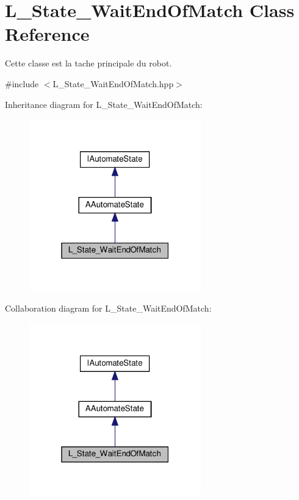 \hypertarget{classL__State__WaitEndOfMatch}{}\section{L\+\_\+\+State\+\_\+\+Wait\+End\+Of\+Match Class Reference}
\label{classL__State__WaitEndOfMatch}


Cette classe est la tache principale du robot.  




{\ttfamily \#include $<$L\+\_\+\+State\+\_\+\+Wait\+End\+Of\+Match.\+hpp$>$}



Inheritance diagram for L\+\_\+\+State\+\_\+\+Wait\+End\+Of\+Match\+:
\nopagebreak
\begin{figure}[H]
\begin{center}
\leavevmode
\includegraphics[width=211pt]{classL__State__WaitEndOfMatch__inherit__graph}
\end{center}
\end{figure}


Collaboration diagram for L\+\_\+\+State\+\_\+\+Wait\+End\+Of\+Match\+:
\nopagebreak
\begin{figure}[H]
\begin{center}
\leavevmode
\includegraphics[width=211pt]{classL__State__WaitEndOfMatch__coll__graph}
\end{center}
\end{figure}
